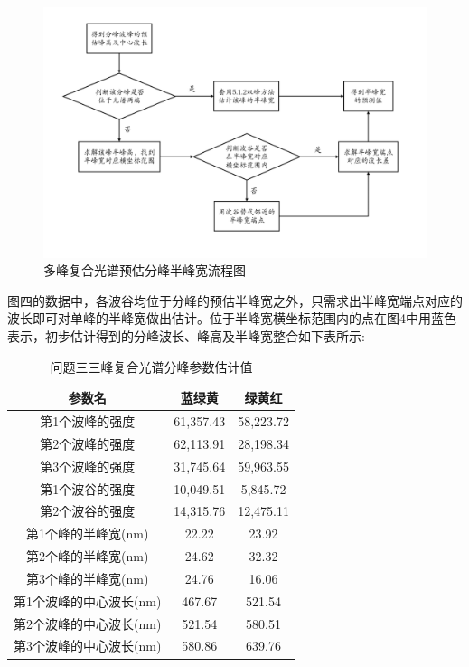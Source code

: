 \documentclass{article}
\numberwithin{equation}{subsection}
\begin{document}
\begin{figure}[H]
    \centering
    \includegraphics[scale=0.55]{半峰宽预估程序框图.PNG}
    \caption{多峰复合光谱预估分峰半峰宽流程图}
\end{figure}
图四的数据中，各波谷均位于分峰的预估半峰宽之外，只需求出半峰宽端点对应的波长即可对单峰的半峰宽做出估计。位于半峰宽横坐标范围内的点在图4中用蓝色表示，初步估计得到的分峰波长、峰高及半峰宽整合如下表所示:
\begin{table}[h]
    \centering
    \begin{tabular}{|c|c|c|}\hline
        参数名 &蓝绿黄&绿黄红\\\hline
        第1个波峰的强度&61,357.43
        &58,223.72
        \\        
        第2个波峰的强度&62,113.91
        &28,198.34
        \\
        第3个波峰的强度&31,745.64
        &59,963.55
        \\
        第1个波谷的强度&10,049.51
        &5,845.72
        \\
        第2个波谷的强度&14,315.76
        &12,475.11
        \\
        第1个峰的半峰宽(nm)&22.22
        &23.92
        \\
        第2个峰的半峰宽(nm)&24.62
        &32.32
        \\
        第3个峰的半峰宽(nm)&24.76
        &16.06
        \\第1个波峰的中心波长(nm)&467.67
        &521.54
        \\
        第2个波峰的中心波长(nm)&521.54
        &580.51
        \\
        第3个波峰的中心波长(nm)&580.86
        &639.76
        \\
        \hline
    \end{tabular}
    \caption{问题三三峰复合光谱分峰参数估计值}
    \label{tab:Margin_settings}
\end{table}
\end{document}
